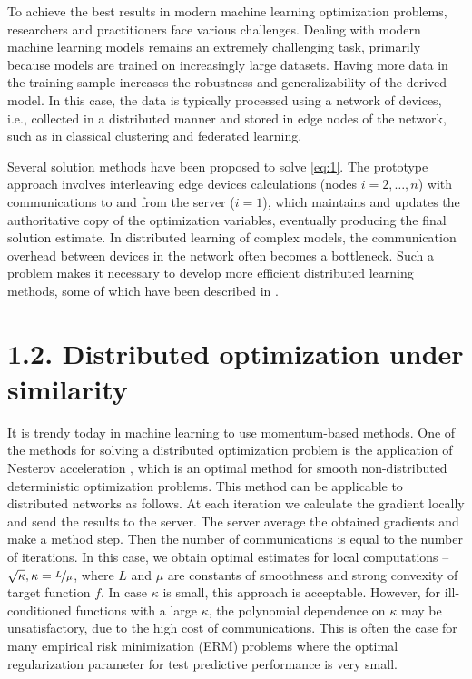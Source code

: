 \documentclass{article}
\theoremstyle{definition}
\theoremstyle{plain}
\begin{document}
To achieve the best results in modern machine learning optimization problems, researchers and practitioners face various challenges. Dealing with modern machine learning models remains an extremely challenging task, primarily because models are trained on increasingly large datasets. Having more data in the training sample increases the robustness and generalizability of the derived model. In this case, the data is typically processed using a network of devices, i.e., collected in a distributed manner and stored in edge nodes of the network, such as in classical clustering \cite{verbraeken2020survey} and federated  \cite{konevcny2016federated, li2020federated, kairouz2021advances} learning.

Several solution methods have been proposed to solve \eqref{eq:1}. The prototype approach involves interleaving edge devices calculations (nodes $i = 2, \ldots, n$) with communications to and from the server ($i = 1$), which maintains and updates the authoritative copy of the optimization variables, eventually producing the final solution estimate. In distributed learning of complex models, the communication overhead between devices in the network often becomes a bottleneck. Such a problem makes it necessary to develop more efficient distributed learning methods, some of which have been described in \cite{konevcny2016federated, ghosh2020communication, smith2018cocoa, gorbunov2021marina}.

\section*{1.2. Distributed optimization under similarity}

It is trendy today in machine learning to use momentum-based methods. One of the methods for solving a distributed optimization problem is the application of Nesterov acceleration \cite{nesterov2018lectures}, which is an optimal method for smooth non-distributed deterministic optimization problems. This method can be applicable to distributed networks as follows. At each iteration we calculate the gradient locally and send the results to the server. The server average the obtained gradients and make a method step. Then the number of communications is equal to the number of iterations. In this case, we obtain optimal estimates for local computations -- $\sqrt{\kappa}, \kappa = \nicefrac{L}{\mu}$, where $L$ and $\mu$ are constants of smoothness and strong convexity of target function $f$. In case $\kappa$ is small, this approach is acceptable. However, for ill-conditioned functions with a large $\kappa$, the polynomial dependence on $\kappa$ may be unsatisfactory, due to the high cost of communications. This is often the case for many empirical risk minimization (ERM) problems where the optimal regularization parameter for test predictive performance is very small.
\end{document}
